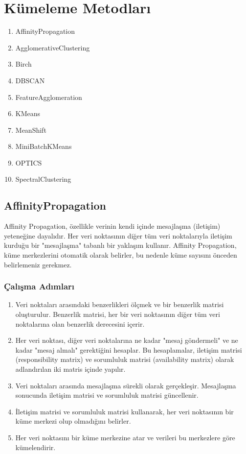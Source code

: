 \section{Kümeleme Metodları} 
\begin{enumerate}
    \item AffinityPropagation
    \item AgglomerativeClustering
    \item Birch
    \item DBSCAN
    \item FeatureAgglomeration
    \item KMeans
    \item MeanShift
    \item MiniBatchKMeans
    \item OPTICS
    \item SpectralClustering
\end{enumerate}

\subsection{AffinityPropagation}
Affinity Propagation, özellikle verinin kendi içinde mesajlaşma (iletişim) yeteneğine dayalıdır. Her veri noktasının diğer tüm veri noktalarıyla iletişim kurduğu bir "mesajlaşma" tabanlı bir yaklaşım kullanır. Affinity Propagation, küme merkezlerini otomatik olarak belirler, bu nedenle küme sayısını önceden belirlemeniz gerekmez.

\subsubsection{Çalışma Adımları}
\begin{enumerate}
    \item Veri noktaları arasındaki benzerlikleri ölçmek ve bir benzerlik matrisi oluşturulur. Benzerlik matrisi, her bir veri noktasının diğer tüm veri noktalarına olan benzerlik derecesini içerir.
    \item Her veri noktası, diğer veri noktalarına ne kadar "mesaj göndermeli" ve ne kadar "mesaj almalı" gerektiğini hesaplar. Bu hesaplamalar, iletişim matrisi (responsibility matrix) ve sorumluluk matrisi (availability matrix) olarak adlandırılan iki matris içinde yapılır.
    \item Veri noktaları arasında mesajlaşma sürekli olarak gerçekleşir. Mesajlaşma sonucunda iletişim matrisi ve sorumluluk matrisi güncellenir.
    \item İletişim matrisi ve sorumluluk matrisi kullanarak, her veri noktasının bir küme merkezi olup olmadığını belirler.
    \item Her veri noktasını bir küme merkezine atar ve verileri bu merkezlere göre kümelendirir.
\end{enumerate}

